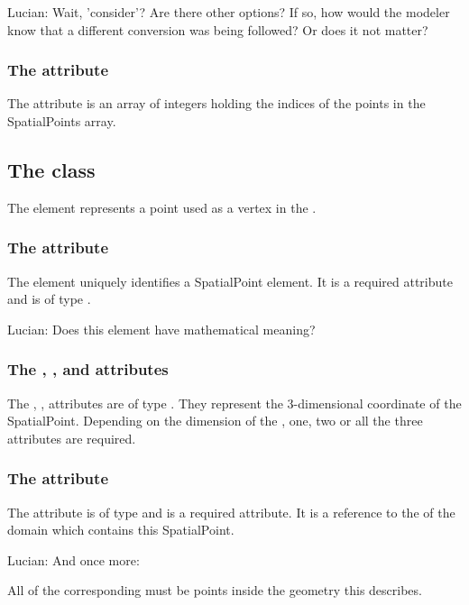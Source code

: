 {\color{red} Lucian: \notice Wait, 'consider'?  Are there other options?  If so, how would the modeler know that a different conversion was being followed?  Or does it not matter?}


\subsubsection{The  attribute}
The  attribute is an array of integers holding the indices of the points in the SpatialPoints array.


\subsection{The  class}
\label{SpatialPoint-class}
The \SpatialPoint element represents a point used as a vertex in the \ParametricGeometry.

\subsubsection{The  attribute}
The  element uniquely identifies a SpatialPoint element. It is a required attribute and is of type .

{\color{red} Lucian: \notice Does this element have mathematical meaning?}

\subsubsection{The , , and  attributes}
The , ,  attributes are of type . They represent the 3-dimensional coordinate of the SpatialPoint. Depending on the dimension of the \Geometry, one, two or all the three attributes are required. 

\subsubsection{The  attribute}
The  attribute is of type  and is a required attribute. It is a reference to the  of the domain which contains this SpatialPoint.

{\color{red} Lucian: \notice And once more:}

All \InteriorPoints of the corresponding \Domain must be points inside the geometry this \SpatialPoint describes.


